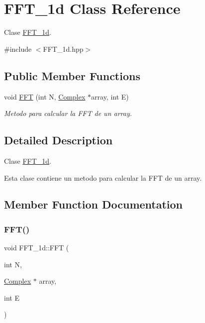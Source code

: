 \hypertarget{classFFT__1d}{}\section{F\+F\+T\+\_\+1d Class Reference}
\label{classFFT__1d}


Clase \hyperlink{classFFT__1d}{F\+F\+T\+\_\+1d}.  




{\ttfamily \#include $<$F\+F\+T\+\_\+1d.\+hpp$>$}

\subsection*{Public Member Functions}
\begin{DoxyCompactItemize}
\item 
void \hyperlink{classFFT__1d_a9af24a15a86cc52a3d7311d99097a918}{F\+FT} (int N, \hyperlink{classComplex}{Complex} $\ast$array, int E)
\begin{DoxyCompactList}\small\item\em Metodo para calcular la F\+FT de un array. \end{DoxyCompactList}\end{DoxyCompactItemize}


\subsection{Detailed Description}
Clase \hyperlink{classFFT__1d}{F\+F\+T\+\_\+1d}. 

Esta clase contiene un metodo para calcular la F\+FT de un array. 

\subsection{Member Function Documentation}
\mbox{\label{classFFT__1d_a9af24a15a86cc52a3d7311d99097a918}} 
\subsubsection{\texorpdfstring{F\+F\+T()}{FFT()}}
{\footnotesize\ttfamily void F\+F\+T\+\_\+1d\+::\+F\+FT (\begin{DoxyParamCaption}\item[{int}]{N,  }\item[{\hyperlink{classComplex}{Complex} $\ast$}]{array,  }\item[{int}]{E }\end{DoxyParamCaption})}



